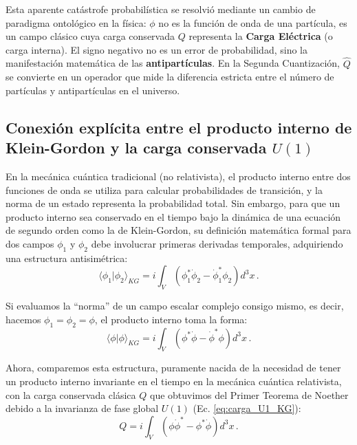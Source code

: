 Esta aparente catástrofe probabilística se resolvió mediante un cambio de paradigma ontológico en la física: $\phi$ no es la función de onda de una partícula, es un campo clásico cuya carga conservada $Q$ representa la \textbf{Carga Eléctrica} (o carga interna). El signo negativo no es un error de probabilidad, sino la manifestación matemática de las \textbf{antipartículas}. En la Segunda Cuantización, $\hat{Q}$ se convierte en un operador que mide la diferencia estricta entre el número de partículas y antipartículas en el universo.

\subsection{Conexión explícita entre el producto interno de Klein-Gordon y la carga conservada $U(1)$}
\label{sec:conexion_KG_U1}

En la mecánica cuántica tradicional (no relativista), el producto interno entre dos funciones de onda se utiliza para calcular probabilidades de transición, y la norma de un estado representa la probabilidad total. Sin embargo, para que un producto interno sea conservado en el tiempo bajo la dinámica de una ecuación de segundo orden como la de Klein-Gordon, su definición matemática formal para dos campos $\phi_1$ y $\phi_2$ debe involucrar primeras derivadas temporales, adquiriendo una estructura antisimétrica:
\begin{equation}
    \langle \phi_1 | \phi_2 \rangle_{KG} = i \int_V \left( \phi_1^* \dot{\phi}_2 - \dot{\phi}_1^* \phi_2 \right) d^3x \, .
    \label{eq:producto_interno_KG}
\end{equation}

Si evaluamos la ``norma'' de un campo escalar complejo consigo mismo, es decir, hacemos $\phi_1 = \phi_2 = \phi$, el producto interno toma la forma:
\begin{equation}
    \langle \phi | \phi \rangle_{KG} = i \int_V \left( \phi^* \dot{\phi} - \dot{\phi}^* \phi \right) d^3x \, .
\end{equation}

Ahora, comparemos esta estructura, puramente nacida de la necesidad de tener un producto interno invariante en el tiempo en la mecánica cuántica relativista, con la carga conservada clásica $Q$ que obtuvimos del Primer Teorema de Noether debido a la invarianza de fase global $U(1)$ (Ec. \eqref{eq:carga_U1_KG}):
\begin{equation}
    Q = i \int_V \left( \phi \dot{\phi}^* - \phi^* \dot{\phi} \right) d^3x \, .
\end{equation}

